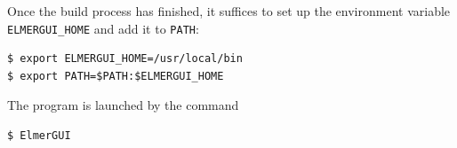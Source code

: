 

Once the build process has finished, it suffices to set up the environment variable {\tt ELMERGUI\_HOME}
and add it to {\tt PATH}:
\begin{verbatim}
$ export ELMERGUI_HOME=/usr/local/bin
$ export PATH=$PATH:$ELMERGUI_HOME
\end{verbatim}
The program is launched by the command
\begin{verbatim}
$ ElmerGUI
\end{verbatim}







